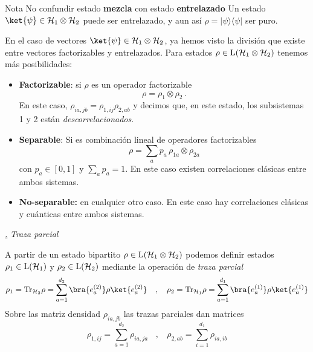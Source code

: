 \documentclass[a4paper,11pt]{book} %
\numberwithin{equation}{chapter}
\newcommand{\ketbra}[2]{| #1\rangle \! \langle #2|}
\def\subsubiContadorIt{\par\addtocounter{subsubsection}{1}\underline{\it\thesubsubsection.}\hskip0.5cm \setcounter{subsubsubsectionIt}{0}}
\newcommand{\SubsubiIt}[1]{
		\subsubiContadorIt \textit{#1}
	}
\newcounter{subsubsubsectionIt}[subsubsection]
\begin{document}
\begin{mybox_blue}{Nota}
No confundir estado \textbf{mezcla} con estado \textbf{entrelazado} Un estado $\ket{\psi}\in \mathcal{H}_1\otimes\mathcal{H}_2$ puede ser entrelazado, y aun así $\rho = \ketbra{\psi}{\psi}$ ser puro.
\end{mybox_blue}
En el caso de vectores $\ket{\psi} \in \mathcal{H}_1\otimes \mathcal{H}_2$, ya hemos visto la división que existe entre vectores factorizables y entrelazados. Para estados $\rho \in {\rm L}(\mathcal{H}_1\otimes \mathcal{H}_2)$ tenemos más posibilidades:
\begin{itemize}
	\item \textbf{Factorizable}: si $\rho$ es un operador factorizable 
		\begin{equation}
		\rho = \rho_1\otimes \rho_2\, .
		\end{equation}
	En este caso, $\rho_{ia,jb} = \rho_{1,ij}\rho_{2,ab}$ y decimos que, en este estado, los subsistemas 1 y 2 están \textit{descorrelacionados}. 
	
	\item \textbf{Separable}: Si es combinación lineal de operadores factorizables
		\begin{equation}
		\rho=\sum_a p_a \, \rho_{1a}\otimes\rho_{2a}
		\end{equation}
	con $p_a\in [0,1]$ y $\sum_a p_a = 1$. En este caso existen correlaciones clásicas entre ambos sistemas.
	
	\item \textbf{No-separable:} en cualquier otro caso. En este caso hay correlaciones clásicas y cuánticas entre ambos sistemas.
	
\end{itemize}


			\SubsubiIt{Traza parcial}

A partir de un estado bipartito $\rho \in {\rm L}(\mathcal{H}_1\otimes\mathcal{H}_2)$  podemos definir estados $\rho_1 \in {\rm L}(\mathcal{H}_1)$ y $\rho_2 \in {\rm L}(\mathcal{H}_2)$ mediante la operación de \textit{traza parcial}
	\begin{equation}
	\rho_1 = {\rm Tr}_{\mathcal{H}_2}\rho = \sum_{a=1}^{d_2} \bra{e_a^{(2)}} \rho \ket{e_a^{(2)}}\quad , \quad \rho_2 = {\rm Tr}_{\mathcal{H}_1}\rho = \sum_{a=1}^{d_1} \bra{e_a^{(1)}} \rho \ket{e_a^{(1)}}
	\end{equation}
Sobre las matriz densidad $\rho_{ia,jb}$ las trazas parciales dan matrices 
	\begin{equation}
	\rho_{1,ij}= \sum_{a=1}^{d_2} \rho_{ia,ja} ~~~~,~~~~ \rho_{2,ab} = \sum_{i=1}^{d_1} \rho_{ia,ib}
	\end{equation}
\end{document}
